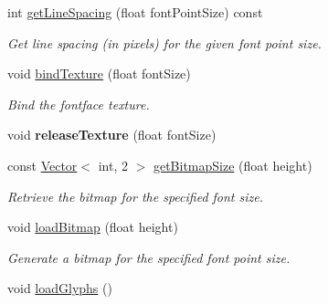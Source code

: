 \begin{Indent}
\begin{DoxyCompactItemize}
\mbox{\label{classrev_1_1_font_face_a82f4e01254aeebcffa30559ebbdf1fd1}} 
int \mbox{\hyperlink{classrev_1_1_font_face_a82f4e01254aeebcffa30559ebbdf1fd1}{get\+Line\+Spacing}} (float font\+Point\+Size) const
\begin{DoxyCompactList}\small\item\em Get line spacing (in pixels) for the given font point size. \end{DoxyCompactList}\item 
\mbox{\label{classrev_1_1_font_face_aba69afe56e1642dd968b214005fbcefc}} 
void \mbox{\hyperlink{classrev_1_1_font_face_aba69afe56e1642dd968b214005fbcefc}{bind\+Texture}} (float font\+Size)
\begin{DoxyCompactList}\small\item\em Bind the fontface texture. \end{DoxyCompactList}\item 
\mbox{\label{classrev_1_1_font_face_ac3da64b8fee649f4c6ea5c6759b0a84d}} 
void {\bfseries release\+Texture} (float font\+Size)
\item 
\mbox{\label{classrev_1_1_font_face_a676891ee78f3ca11da83832f9ca5e0dc}} 
const \mbox{\hyperlink{classrev_1_1_vector}{Vector}}$<$ int, 2 $>$ \mbox{\hyperlink{classrev_1_1_font_face_a676891ee78f3ca11da83832f9ca5e0dc}{get\+Bitmap\+Size}} (float height)
\begin{DoxyCompactList}\small\item\em Retrieve the bitmap for the specified font size. \end{DoxyCompactList}\item 
\mbox{\label{classrev_1_1_font_face_ac5c2a42a17d60d1b151302bbae923997}} 
void \mbox{\hyperlink{classrev_1_1_font_face_ac5c2a42a17d60d1b151302bbae923997}{load\+Bitmap}} (float height)
\begin{DoxyCompactList}\small\item\em Generate a bitmap for the specified font point size. \end{DoxyCompactList}\item 
\mbox{\label{classrev_1_1_font_face_a93bdc9c699a1b944eac72728790621c2}} 
void \mbox{\hyperlink{classrev_1_1_font_face_a93bdc9c699a1b944eac72728790621c2}{load\+Glyphs}} ()

\end{DoxyCompactItemize}
\end{Indent}
